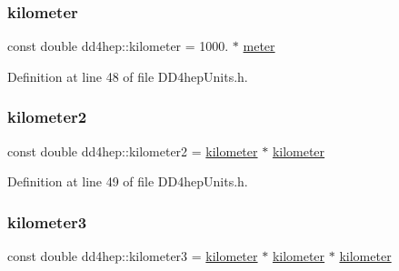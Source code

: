 \hypertarget{namespacedd4hep_a689bd0289c6c83e392d385bc870a34ab}{}\label{namespacedd4hep_a689bd0289c6c83e392d385bc870a34ab} 
\subsubsection{\texorpdfstring{kilometer}{kilometer}}
{\footnotesize\ttfamily const double dd4hep\+::kilometer = 1000. $\ast$ \hyperlink{namespacedd4hep_a46f5cf0231796af4296a307a58812b06}{meter}\hspace{0.3cm}{\ttfamily [static]}}



Definition at line 48 of file D\+D4hep\+Units.\+h.

\hypertarget{namespacedd4hep_a61bb5393f7b8ec3694cb8e522145695f}{}\label{namespacedd4hep_a61bb5393f7b8ec3694cb8e522145695f} 
\subsubsection{\texorpdfstring{kilometer2}{kilometer2}}
{\footnotesize\ttfamily const double dd4hep\+::kilometer2 = \hyperlink{namespacedd4hep_a689bd0289c6c83e392d385bc870a34ab}{kilometer} $\ast$ \hyperlink{namespacedd4hep_a689bd0289c6c83e392d385bc870a34ab}{kilometer}\hspace{0.3cm}{\ttfamily [static]}}



Definition at line 49 of file D\+D4hep\+Units.\+h.

\hypertarget{namespacedd4hep_a4501dea229a9ace2c46c427c69ddb5aa}{}\label{namespacedd4hep_a4501dea229a9ace2c46c427c69ddb5aa} 
\subsubsection{\texorpdfstring{kilometer3}{kilometer3}}
{\footnotesize\ttfamily const double dd4hep\+::kilometer3 = \hyperlink{namespacedd4hep_a689bd0289c6c83e392d385bc870a34ab}{kilometer} $\ast$ \hyperlink{namespacedd4hep_a689bd0289c6c83e392d385bc870a34ab}{kilometer} $\ast$ \hyperlink{namespacedd4hep_a689bd0289c6c83e392d385bc870a34ab}{kilometer}\hspace{0.3cm}{\ttfamily [static]}}



